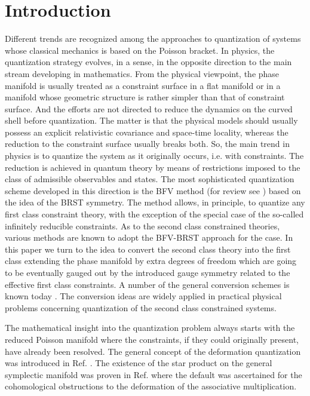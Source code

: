 \documentclass[a4paper,11pt,oneside]{amsart}
\theoremstyle{plain}
\numberwithin{equation}{section} %
\numberwithin{figure}{section} %
\begin{document}
\bigskip

\bigskip

\section{Introduction}
Different trends are recognized among the approaches to quantization
of systems whose classical mechanics is based on the Poisson
bracket. In physics, the quantization strategy evolves, in a sense, in the
opposite direction to the main stream developing
in mathematics. {}From the physical viewpoint, the phase manifold is
usually treated as a constraint surface in a flat manifold
or in a manifold whose geometric structure
is rather simpler than that of constraint surface.  And the efforts are
not directed to reduce the dynamics on the curved shell before
quantization.  The matter is that the physical models should usually
possess an explicit relativistic covariance and space-time locality,
whereas the reduction to the constraint surface usually breaks both.  So,
the main trend in physics is to quantize the system as it originally
occurs, i.e. with constraints.  The reduction is achieved in quantum
theory by means of restrictions imposed to the class of admissible
observables and states.  The most sophisticated quantization scheme
developed in this direction is the BFV method \cite{[BFV]} (for review see
\cite{[HT]}) based on the idea of the BRST symmetry. The method allows, in
principle, to quantize any first class constraint theory, with the
exception of the special case of the so-called infinitely reducible
constraints. As to the second class constrained theories, various methods
are known  to  adopt the BFV-BRST approach for the case.  In this paper we
turn to the idea to convert the second class theory into the first class
extending the phase manifold by extra degrees of freedom which are going
to be eventually gauged out by the introduced gauge symmetry related to
the effective first class constraints.  A number of the general conversion
schemes is known today \cite{[FSh],[BF],[BF87],[BT]}.  The conversion ideas
are widely applied in practical physical problems concerning quantization of
the second class constrained systems.


\noindent
The mathematical insight into the quantization problem always starts
with the reduced Poisson manifold where the constraints, if they could
originally present, have already been resolved.
The general concept of the deformation quantization
was introduced in Ref. \cite{[Berezin],[BFFLS]}.
The existence of the star product on the
general symplectic manifold was proven in Ref. \cite{[DWL]}
where the default was ascertained for the cohomological obstructions
to the deformation of the associative multiplication.
\end{document}
